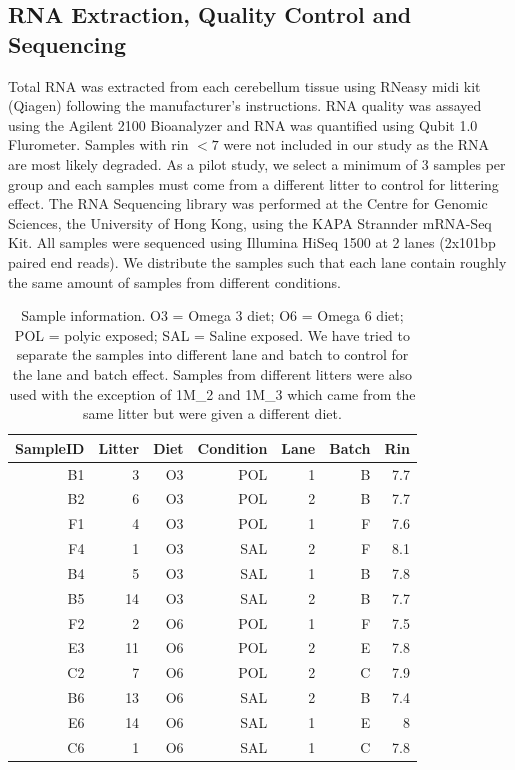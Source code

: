\subsection{RNA Extraction, Quality Control and Sequencing}
Total RNA was extracted from each cerebellum tissue using RNeasy midi kit (Qiagen) following the manufacturer's instructions.
RNA quality was assayed using the Agilent 2100 Bioanalyzer and RNA was quantified using Qubit 1.0 Flurometer.
Samples with \gls{rin} $<7$ were not included in our study as the RNA are most likely degraded.
As a pilot study, we select a minimum of 3 samples per group and each samples must come from a different litter to control for littering effect.
The RNA Sequencing library was performed at the Centre for Genomic Sciences, the University of Hong Kong, using the KAPA Strannder mRNA-Seq Kit. 
All samples were sequenced using Illumina HiSeq 1500 at 2 lanes (2x101bp paired end reads).
We distribute the samples such that each lane contain roughly the same amount of samples from different conditions.
\begin{table}
	\centering
	\begin{tabular}{rrrrrrr}
		\toprule
		SampleID & Litter & Diet & Condition & Lane & Batch & Rin\\
		\midrule
		B1&	3&	O3&	POL&	1&	B&	7.7\\
		B2&	6&	O3&	POL&	2&	B&	7.7\\
		F1&	4&	O3&	POL&	1&	F&	7.6\\
		F4&	1&	O3&	SAL&	2&	F&	8.1\\
		B4&	5&	O3&	SAL&	1&	B&	7.8\\
		B5&	14&	O3&	SAL&	2&	B&	7.7\\
		F2&	2&	O6&	POL&	1&	F&	7.5\\
		E3&	11&	O6&	POL&	2&	E&	7.8\\
		C2&	7&	O6&	POL&	2&	C&	7.9\\
		B6&	13&	O6&	SAL&	2&	B&	7.4\\
		E6&	14&	O6&	SAL&	1&	E&	8\\
		C6&	1&	O6&	SAL&	1&	C&	7.8\\
		\bottomrule
	\end{tabular}
	\caption[Sample Information]{
		Sample information.
		O3 = Omega 3 diet; O6 = Omega 6 diet; POL = \gls{polyic} exposed; SAL = Saline exposed.
		We have tried to separate the samples into different lane and batch to control for the lane and batch effect. 
		Samples from different litters were also used with the exception of 1M\_2 and 1M\_3 which came from the same litter but were given a different diet.
	}
\end{table}
